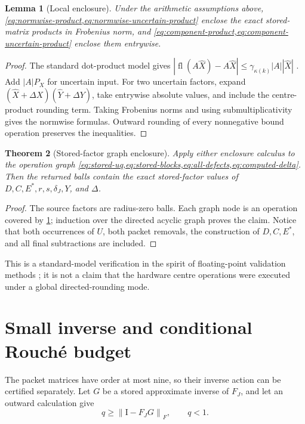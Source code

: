 \documentclass[11pt]{article}
\newtheorem{theorem}{Theorem}[section]
\newtheorem{lemma}[theorem]{Lemma}
\theoremstyle{definition}
\theoremstyle{remark}
\newcommand{\Id}{\mathrm I}
\newcommand{\fl}{\operatorname{fl}}
\newcommand{\norm}[1]{\left\lVert#1\right\rVert}
\begin{document}
\begin{lemma}[Local enclosure]
\label{lem:local-enclosure}
Under the arithmetic assumptions above,
\cref{eq:normwise-product,eq:normwise-uncertain-product} enclose the exact
stored-matrix products in Frobenius norm, and
\cref{eq:component-product,eq:component-uncertain-product} enclose them
entrywise.
\end{lemma}

\begin{proof}
The standard dot-product model gives
\(|\fl(A\widehat X)-A\widehat X|
\leq\gamma_{\kappa(k)}|A||\widehat X|\)
\citep{Higham2002}.  Add \(|A|P_X\) for uncertain input.  For two uncertain
factors, expand
\((\widehat X+\Delta X)(\widehat Y+\Delta Y)\), take entrywise absolute
values, and include the centre-product rounding term.  Taking Frobenius
norms and using submultiplicativity gives the normwise formulas.  Outward
rounding of every nonnegative bound operation preserves the inequalities.
\end{proof}

\begin{theorem}[Stored-factor graph enclosure]
\label{thm:graph-enclosure}
Apply either enclosure calculus to the operation graph
\cref{eq:stored-uq,eq:stored-blocks,eq:all-defects,eq:computed-delta}.
Then the returned balls contain the exact stored-factor values of
\(D,C,E^*,r,s,\delta_J,Y\), and \(\Delta\).
\end{theorem}

\begin{proof}
The source factors are radius-zero balls.  Each graph node is an operation
covered by \cref{lem:local-enclosure}; induction over the directed acyclic
graph proves the claim.  Notice that both occurrences of \(U\), both packet
removals, the construction of \(D,C,E^*\), and all final subtractions are
included.
\end{proof}

This is a standard-model verification in the spirit of floating-point
validation methods \citep{MooreKearfottCloud2009,Rump2010}; it is not a
claim that the hardware centre operations were executed under a global
directed-rounding mode.

\section{Small inverse and conditional Rouch\'e budget}
\label{sec:budget}

The packet matrices have order at most nine, so their inverse action can be
certified separately.  Let \(G\) be a stored approximate inverse of
\(F_J\), and let an outward calculation give
\begin{equation}
 q\geq\norm{\Id-F_JG}_F,
 \qquad q<1.
 \label{eq:neumann-defect}
\end{equation}
\end{document}
